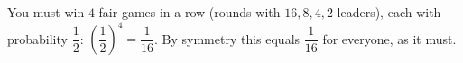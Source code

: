 You must win $4$ fair games in a row (rounds with $16,8,4,2$ leaders), each with probability $\dfrac12$: $\left(\dfrac12\right)^4=\boxed{\dfrac1{16}}$. By symmetry this equals $\dfrac1{16}$ for everyone, as it must.

